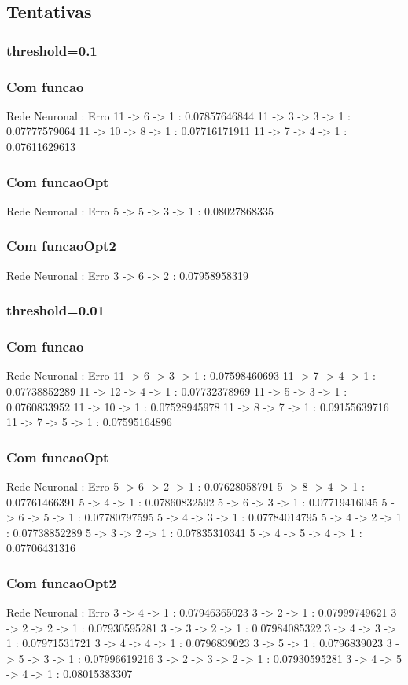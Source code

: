 \documentclass{article}
\begin{document}
{\subsection{Tentativas}

\subsubsection{threshold=0.1}
\subsubsection{Com funcao}
Rede Neuronal : Erro
11 -> 6 -> 1 : 0.07857646844
11 -> 3 -> 3 -> 1 : 0.07777579064
11 -> 10 -> 8 -> 1 : 0.07716171911
11 -> 7 -> 4 -> 1 : 0.07611629613

\subsubsection{Com funcaoOpt}
Rede Neuronal : Erro
5 -> 5 -> 3 -> 1 : 0.08027868335

\subsubsection{Com funcaoOpt2}
Rede Neuronal : Erro
3 -> 6 -> 2 : 0.07958958319

\subsubsection{threshold=0.01}
\subsubsection{Com funcao}
Rede Neuronal : Erro
11 -> 6 -> 3 -> 1 : 0.07598460693
11 -> 7 -> 4 -> 1 : 0.07738852289
11 -> 12 -> 4 -> 1 : 0.07732378969
11 -> 5 -> 3 -> 1 : 0.0760833952
11 -> 10 -> 1 : 0.07528945978
11 -> 8 -> 7 -> 1 : 0.09155639716
11 -> 7 -> 5 -> 1 : 0.07595164896

\subsubsection{Com funcaoOpt}
Rede Neuronal : Erro
5 -> 6 -> 2 -> 1 : 0.07628058791
5 -> 8 -> 4 -> 1 : 0.07761466391
5 -> 4 -> 1 : 0.07860832592
5 -> 6 -> 3 -> 1 : 0.07719416045
5 -> 6 -> 5 -> 1 : 0.07780797595
5 -> 4 -> 3 -> 1 : 0.07784014795
5 -> 4 -> 2 -> 1 : 0.07738852289
5 -> 3 -> 2 -> 1 : 0.07835310341
5 -> 4 -> 5 -> 4 -> 1 : 0.07706431316

\subsubsection{Com funcaoOpt2}
Rede Neuronal : Erro
3 -> 4 -> 1 : 0.07946365023
3 -> 2 -> 1 : 0.07999749621
3 -> 2 -> 2 -> 1 : 0.07930595281
3 -> 3 -> 2 -> 1 : 0.07984085322
3 -> 4 -> 3 -> 1 : 0.07971531721
3 -> 4 -> 4 -> 1 : 0.0796839023
3 -> 5 -> 1 : 0.0796839023
3 -> 5 -> 3 -> 1 : 0.07996619216
3 -> 2 -> 3 -> 2 -> 1 : 0.07930595281
3 -> 4 -> 5 -> 4 -> 1 : 0.08015383307

}
\end{document}
